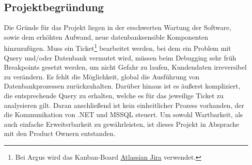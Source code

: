 \documentclass[11pt,toc=sectionentrywithoutdots, 
headheight=44pt, headings=optiontoheadandtoc, hyperfootnotes=false, hypertexnames=false]{scrartcl}
\begin{document}
\subsection{Projektbegründung}
Die Gründe für das Projekt liegen in der erschwerten Wartung der Software, sowie dem erhöhten Aufwand, neue datenbanksensible Komponenten hinzuzufügen. Muss ein Ticket\footnote{Bei Argus wird das \gls{Kanban}-Board \href{https://www.atlassian.com/software/jira}{Atlassian Jira} verwendet.} bearbeitet werden, bei dem ein Problem mit Query und/oder Datenbank vermutet wird, müssen beim Debugging sehr früh Breakpoints gesetzt werden, um nicht Gefahr zu laufen, Kundendaten irreversibel zu verändern. Es fehlt die Möglichkeit, global die Ausführung von Datenbankprozessen zurückzuhalten. Darüber hinaus ist es äußerst kompliziert, die entsprechende Query zu erhalten, welche es für das jeweilige Ticket zu analysieren gilt. Daran anschließend ist kein einheitlicher Prozess vorhanden, der die Kommunikation von .NET und MSSQL steuert. Um sowohl Wartbarkeit, als auch einfache Erweiterbarkeit zu gewährleisten, ist dieses Projekt in Absprache mit den \gls{Product Owner}n entstanden.
\end{document}
